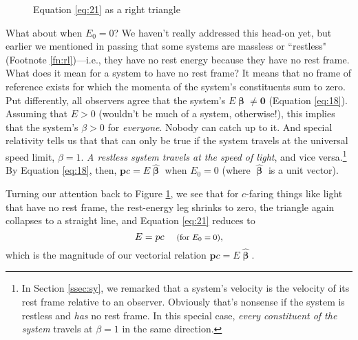\documentclass[12pt]{article}
\renewcommand{\vv}[1]{\mathbf{#1}}
\newcommand{\vvbeta}{\bm{\upbeta}}
\newcommand{\hatbeta}{\bm{\hat{\upbeta}}}
\begin{document}
\begin{figure}[h]
\centering
\caption{Equation \ref{eq:21} as a right triangle}
\label{f:1}
\vspace{10pt}
\end{figure}

What about when $E_0 = 0$? We haven't really addressed this head-on yet, but earlier we mentioned in passing that some systems are massless or ``restless" (Footnote \ref{fn:rl})---i.e., they have no rest energy because they have no rest frame. What does it mean for a system to have no rest frame? It means that no frame of reference exists for which the momenta of the system's constituents sum to zero. Put differently, all observers agree that the system's $E \vvbeta \neq \vv 0$ (Equation \ref{eq:18}). Assuming that $E > 0$ (wouldn't be much of a system, otherwise!), this implies that the system's $\beta > 0$ for \emph{everyone}. Nobody can catch up to it. And special relativity tells us that that can only be true if the system travels at the universal speed limit, $\beta = 1$. \emph{A restless system travels at the speed of light}, and vice versa.\footnote{In Section \ref{ssec:sy}, we remarked that a system's velocity is the velocity of its rest frame relative to an observer. Obviously that's nonsense if the system is restless and \emph{has} no rest frame. In this special case, \emph{every constituent of the system} travels at $\beta = 1$ in the same direction.} By Equation \ref{eq:18}, then, $\vv p c = E \hatbeta$ when $E_0 = 0$ (where $\hatbeta$ is a unit vector).

Turning our attention back to Figure \ref{f:1}, we see that for $c$-faring things like light that have no rest frame, the rest-energy leg shrinks to zero, the triangle again collapses to a straight line, and Equation \ref{eq:21} reduces to
\begin{equation}\label{eq:22}
E=p c \quad \textrm{\footnotesize{ (for $E_0=0$)}},
\end{equation}
which is the magnitude of our vectorial relation $\vv p c = E \hatbeta$.
\end{document}
